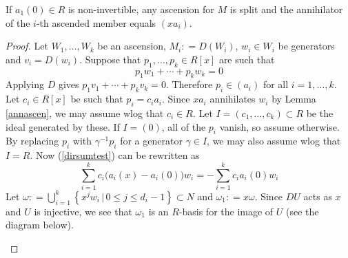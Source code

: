 \begin{proposition}    \label{ascensionisdirect}   
If $ a_{1}(0) \in R $ is non-invertible, any ascension for $ M $  is  split  and the annihilator of the $ i $-th  ascended  member equals $ ( x a_{i} ) $. 
\end{proposition}      
\begin{proof} 
  Let $ W_{1}, \ldots , W_{k} $ be an ascension, $ M _{i} : = D(W_{i}) $,  $ w_{i} \in W_{i} $ be generators and $ v_{i} = D(w_{i}) $.    
Suppose that $ p_{1}, \ldots, p_{k} \in R[x] $ are such that 
\begin{equation} \label{dirsumtest}  p_{1} w_{1} +  \cdots + p_{k} w_{k} = 0  \end{equation}  
Applying $ D $ gives $  p_{1} v_{1} + \cdots + p_{k} v_{k} = 0 $. Therefore $ p_{i}  \in ( a_{i} ) $ for all $ i = 1, \ldots , k $. Let $ c_{i} \in R[x] $ be such that $ p_{i} = c_{i} a_{i} $. Since $ xa_{i} $ annihilates $ w_{i}  $ by Lemma \ref{annascen},  we may assume wlog that $ c_{i}   \in  R $.  Let $ I = (c_{1}, \ldots, c_{k}) \subset R $ be the ideal generated by these.  If $ I = (0) $, all of the $ p_{i} $ vanish, so assume otherwise. By replacing $ p_{i} $ with $  \gamma  ^{-1} p_{i} $ for a generator $ \gamma \in I $, we may also assume wlog  that    $ I = R $. Now (\ref{dirsumtest}) can be rewritten as
\begin{equation}  \label{dirsumtestconseq} \sum_{i=1}^{k}  c_{i} \big ( a_{i}(x) - a_{i}(0)  \big  )w_{i}  =    -  \sum_{i=1}^{k} c_{i} a_{i}(0) w_{i} 
\end{equation}   
Let $  \omega    : =  \bigcup _{ i =1 }^{k} \left \{ x^{j} w_{i} \, | \, 0 \leq j \leq d_{i}  -   1    \right \}  \subset N$ and $ \omega_{ 1 }    :   = x \omega  $.  Since $ DU $ acts as $ x $ and $ U $ is injective, we see that $ \omega  _   {  1  }   $ is an $ R $-basis for the image of $ U $ (see the diagram below).
\begin{center}
\begin{tikzcd}[ 
        ,every arrow/.append style={maps to}
        ,every label/.append style={font = \scriptsize}
] 
  

\end{tikzcd}
\end{center}
\end{proof}
